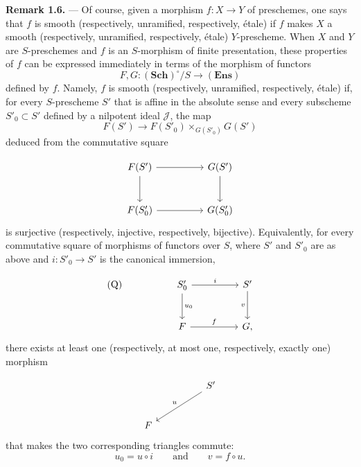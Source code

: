 
\medskip
\noindent{}\textbf{Remark 1.6.} ---
Of course, given a morphism \(f:X\to Y\) of preschemes, one says that
\(f\) is smooth (respectively, unramified, respectively, étale) if
\(f\) makes \(X\) a smooth (respectively, unramified, respectively,
étale) \(Y\)-prescheme.  When \(X\) and \(Y\) are \(S\)-preschemes and
\(f\) is an \(S\)-morphism of finite presentation, these properties of
\(f\) can be expressed immediately in terms of the morphism of
functors
\[
  F,G:(\mathbf{Sch})^\circ/S\longrightarrow(\mathbf{Ens})
\]
defined by \(f\).  Namely, \(f\) is smooth (respectively, unramified,
respectively, étale) if, for every \(S\)-prescheme \(S'\) that is
affine in the absolute sense and every subscheme \(S'_0\subset S'\)
defined by a nilpotent ideal \(\mathscr J\), the map
\[
  F(S')\longrightarrow
  F(S'_0)\times_{G(S'_0)}G(S')
\]
deduced from the commutative square

\[
\begin{tikzcd}[column sep=huge,row sep=large]
  F(S') \arrow[r] \arrow[d] & G(S') \arrow[d] \\
  F(S'_0) \arrow[r] & G(S'_0)
\end{tikzcd}
\]
is surjective (respectively, injective, respectively, bijective).
Equivalently, for every commutative square of morphisms of functors
over \(S\), where \(S'\) and \(S'_0\) are as above and
\(i:S'_0\to S'\) is the canonical immersion,

\[
\begin{tikzcd}[column sep=huge,row sep=large]
  \text{\rm(Q)} & S'_0 \arrow[r,"i"] \arrow[d,"u_0"] &
    S' \arrow[d,"v"'] \\
  & F \arrow[r,"f"] & G ,
\end{tikzcd}
\]
there exists at least one (respectively, at most one, respectively,
exactly one) morphism

\[
\begin{tikzcd}[column sep=huge,row sep=large]
  & S' \arrow[dl,"u"'] \\
  F &
\end{tikzcd}
\]
that makes the two corresponding triangles commute:
\[
  u_0=u\circ i
  \qquad\text{and}\qquad
  v=f\circ u.
\]

